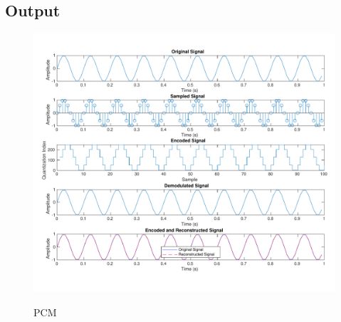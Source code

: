 \subsection{Output}

\begin{figure}[!htb]
    \centering
    \includegraphics[width=\textwidth]{res/figures/pcm_no_quantization.pdf}
    \label{output:pcm}
    \caption{PCM}
\end{figure}
